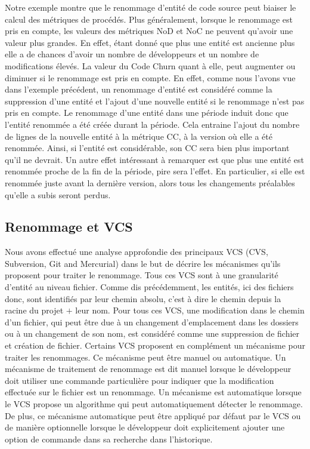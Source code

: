 Notre exemple montre que le renommage d'entité de code source peut biaiser le calcul des métriques de procédés. Plus généralement, lorsque le renommage est pris en compte, les valeurs des métriques NoD et NoC ne peuvent qu'avoir une valeur plus grandes. En effet, étant donné que plus une entité est ancienne plus elle a de chances d'avoir un nombre de développeurs et un nombre de modifications élevés. La valeur du Code Churn quant à elle, peut augmenter ou diminuer si le renommage est pris en compte. En effet, comme nous l'avons vue dans l'exemple précédent, un renommage d'entité est considéré comme la suppression d'une entité et l'ajout d'une nouvelle entité si le renommage n'est pas pris en compte. Le renommage d'une entité dans une période induit donc que l'entité renommée a été créée durant la période. Cela entraine l'ajout du nombre de lignes de la nouvelle entité à la métrique CC, à la version où elle a été renommée. Ainsi, si l'entité est considérable, son CC sera bien plus important qu'il ne devrait. Un autre effet intéressant à remarquer est que plus une entité est renommée proche de la fin de la période, pire sera l'effet. En particulier, si elle est renommée juste avant la dernière version, alors tous les changements préalables qu'elle a subis seront perdus.\\

\subsection{Renommage et VCS}

Nous avons effectué une analyse approfondie des principaux VCS (CVS, Subversion, Git and Mercurial) dans le but de décrire les mécanismes qu'ils proposent pour traiter le renommage. Tous ces VCS sont à une granularité d'entité au niveau fichier. Comme dis précédemment, les entités, ici des fichiers donc, sont identifiés par leur chemin absolu, c'est à dire le chemin depuis la racine du projet $+$ leur nom. Pour tous ces VCS, une modification dans le chemin d'un fichier, qui peut être due à un changement d'emplacement dans les dossiers ou à un changement de son nom, est considéré comme une suppression de fichier et création de fichier. Certains VCS proposent en complément un mécanisme pour traiter les renommages. Ce mécanisme peut être manuel ou automatique. Un mécanisme de traitement de renommage est dit manuel lorsque le développeur doit utiliser une commande particulière pour indiquer que la modification effectuée sur le fichier est un renommage. Un mécanisme est automatique lorsque le VCS propose un algorithme qui peut automatiquement détecter le renommage. De plus, ce mécanisme automatique peut être appliqué par défaut par le VCS ou de manière optionnelle lorsque le développeur doit explicitement ajouter une option de commande dans sa recherche dans l'historique.\\
 
